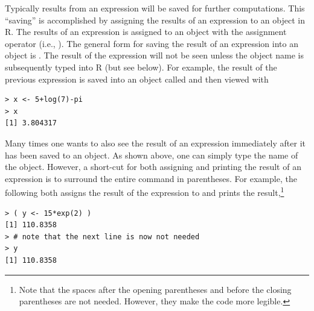 \documentclass[10pt,openany]{book}\usepackage[]{graphicx}\usepackage[]{color}
\makeatletter
\newenvironment{kframe}{%
 \def\at@end@of@kframe{}%
 \ifinner\ifhmode%
  \def\at@end@of@kframe{\end{minipage}}%
  \begin{minipage}{\columnwidth}%
 \fi\fi%
 \def\FrameCommand##1{\hskip\@totalleftmargin \hskip-\fboxsep
 \colorbox{shadecolor}{##1}\hskip-\fboxsep
     \hskip-\linewidth \hskip-\@totalleftmargin \hskip\columnwidth}%
 \MakeFramed {\advance\hsize-\width
   \@totalleftmargin\z@ \linewidth\hsize
   \@setminipage}}%
 {\par\unskip\endMakeFramed%
 \at@end@of@kframe}
\newenvironment{knitrout}{}{} %
\makeatother
\begin{document}
Typically results from an expression will be saved for further computations.  This ``saving'' is accomplished by assigning the results of an expression to an object in R.  The results of an expression is assigned to an object with the assignment operator (i.e., \R{<-}).  The general form for saving the result of an expression into an object is .  The result of the expression will not be seen unless the object name is subsequently typed into R (but see below).  For example, the result of the previous expression is saved into an object called  and then viewed with
\begin{knitrout}
\color{fgcolor}\begin{kframe}
\begin{verbatim}
> x <- 5+log(7)-pi
> x
[1] 3.804317
\end{verbatim}
\end{kframe}
\end{knitrout}
Many times one wants to also see the result of an expression immediately after it has been saved to an object.  As shown above, one can simply type the name of the object.  However, a short-cut for both assigning and printing the result of an expression is to surround the entire command in parentheses.  For example, the following both assigns the result of the expression to  and prints the result,\footnote{Note that the spaces after the opening parentheses and before the closing parentheses are not needed.  However, they make the code more legible.}
\begin{knitrout}
\color{fgcolor}\begin{kframe}
\begin{verbatim}
> ( y <- 15*exp(2) )
[1] 110.8358
> # note that the next line is now not needed
> y
[1] 110.8358
\end{verbatim}
\end{kframe}
\end{knitrout}

\end{document}
